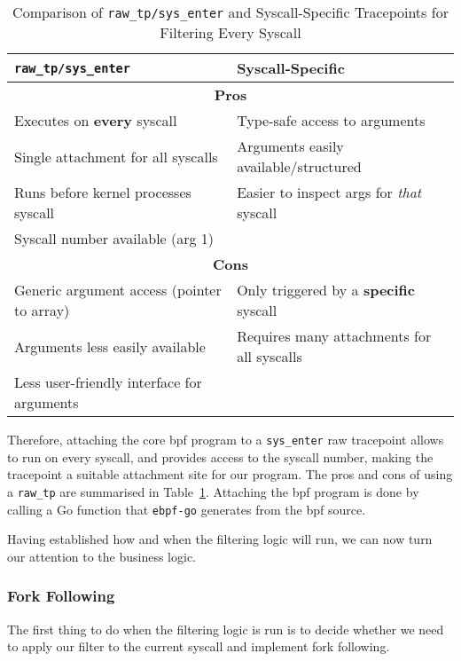 \begin{table}[h!]
\centering
\begin{tabular}{|p{6cm}|p{6cm}|}
\hline
\texttt{raw\_tp/sys\_enter} & \textbf{Syscall-Specific} \\
\hline
\multicolumn{2}{|c|}{\textbf{Pros}} \\
\hline
Executes on \textbf{every} syscall & Type-safe access to arguments \\
Single attachment for all syscalls & Arguments easily available/structured \\
Runs before kernel processes syscall & Easier to inspect args for \textit{that} syscall \\
Syscall number available (arg 1) &  \\
\hline
\multicolumn{2}{|c|}{\textbf{Cons}} \\
\hline
Generic argument access (pointer to array) & Only triggered by a \textbf{specific} syscall \\
Arguments less easily available & Requires many attachments for all syscalls \\
Less user-friendly interface for arguments &  \\
\hline
\end{tabular}
\caption{Comparison of \texttt{raw\_tp/sys\_enter} and Syscall-Specific Tracepoints for Filtering Every Syscall}
\label{tab:tracepoint_comparison}
\end{table}

Therefore, attaching the core \ac{bpf} program to a \texttt{sys\_enter} raw
tracepoint allows \af to run on every syscall, and provides access to the
syscall number, making the tracepoint a suitable attachment site for our
program. The pros and cons of using a \texttt{raw\_tp} are summarised in
Table~\ref{tab:tracepoint_comparison}. Attaching the \ac{bpf} program is done by calling a Go function that
\texttt{ebpf-go} generates from the \ac{bpf} source. 

Having established how and when the \af filtering logic will run, we can now
turn our attention to the business logic.

\subsubsection{Fork Following}

The first thing to do when the filtering logic is run is to decide whether we
need to apply our filter to the current syscall and implement fork following. 

